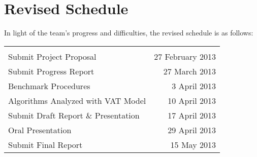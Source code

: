 \section{Revised Schedule}
  In light of the team's progress and difficulties, the revised schedule is as
  follows:
  
  \begin{tabular}{lr}
    &\\
    Submit Project Proposal             & 27 February 2013\\
    Submit Progress Report              & 27 March 2013   \\
    Benchmark Procedures                &  3 April 2013   \\
    Algorithms Analyzed with VAT Model  & 10 April 2013   \\
    Submit Draft Report \& Presentation & 17 April 2013   \\
    Oral Presentation                   & 29 April 2013   \\
    Submit Final Report                 & 15 May 2013     \\
  \end{tabular}
  